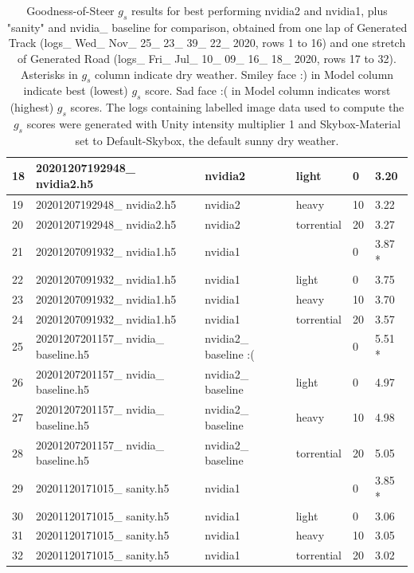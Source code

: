 \begin{table}[]
\begin{center}
\begin{tabular}{|l|l|l|l|l|l|}
18 & 20201207192948\_ nvidia2.h5 & nvidia2 & light & 0 & 3.20 \\ \hline
19 & 20201207192948\_ nvidia2.h5 & nvidia2 & heavy & 10 & 3.22 \\ \hline
20 & 20201207192948\_ nvidia2.h5 & nvidia2 & torrential & 20 & 3.27 \\ \hline
21 & 20201207091932\_ nvidia1.h5 & nvidia1 &  & 0 & 3.87 * \\ \hline
22 & 20201207091932\_ nvidia1.h5 & nvidia1 & light & 0 & 3.75 \\ \hline
23 & 20201207091932\_ nvidia1.h5 & nvidia1 & heavy & 10 & 3.70 \\ \hline
24 & 20201207091932\_ nvidia1.h5 & nvidia1 & torrential & 20 & 3.57 \\ \hline
25 & 20201207201157\_ nvidia\_ baseline.h5 & nvidia2\_ baseline :( &  & 0 & 5.51 * \\ \hline
26 & 20201207201157\_ nvidia\_ baseline.h5 & nvidia2\_ baseline & light & 0 & 4.97 \\ \hline
27 & 20201207201157\_ nvidia\_ baseline.h5 & nvidia2\_ baseline & heavy & 10 & 4.98 \\ \hline
28 & 20201207201157\_ nvidia\_ baseline.h5 & nvidia2\_ baseline & torrential & 20 & 5.05 \\ \hline
29 & 20201120171015\_ sanity.h5 & nvidia1 &  & 0 & 3.85 * \\ \hline
30 & 20201120171015\_ sanity.h5 & nvidia1 & light & 0 & 3.06 \\ \hline
31 & 20201120171015\_ sanity.h5 & nvidia1 & heavy & 10 & 3.05 \\ \hline
32 & 20201120171015\_ sanity.h5 & nvidia1 & torrential & 20 & 3.02 \\ \hline
\end{tabular}
\end{center}
\caption{Goodness-of-Steer $g_s$ results for best performing nvidia2 and nvidia1, plus "sanity" and nvidia\_ baseline for comparison, obtained from one lap of Generated Track (logs\_ Wed\_ Nov\_ 25\_ 23\_ 39\_ 22\_ 2020, rows 1 to 16) and one stretch of Generated Road (logs\_ Fri\_ Jul\_ 10\_ 09\_ 16\_ 18\_ 2020, rows 17 to 32). Asterisks in $g_s$ column indicate dry weather. Smiley face :) in Model column indicate best (lowest) $g_s$ score. Sad face :( in Model column indicates worst (highest) $g_s$ scores. The logs containing labelled image data used to compute the $g_s$ scores were generated with Unity intensity multiplier 1 and Skybox-Material set to Default-Skybox, the default sunny dry weather.}
\label{table:goodness-of-steer}
\end{table}

